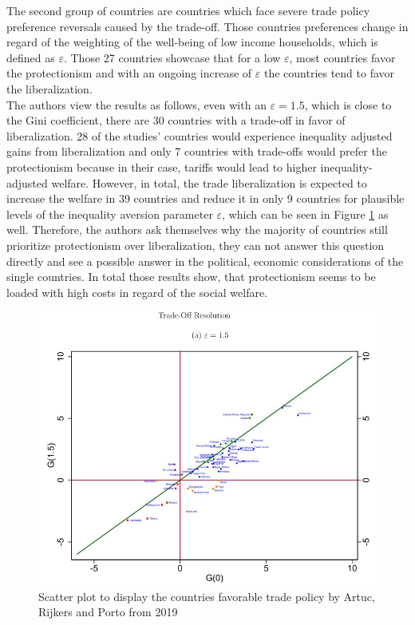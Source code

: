 The second group of countries are countries which face severe trade policy preference reversals caused by the trade-off. Those
countries preferences change in regard of the weighting of the well-being of low income households, which is defined as \(\varepsilon\).
Those 27 countries showcase that for a low \(\varepsilon\), most countries favor the protectionism and with an ongoing increase
of \(\varepsilon\) the countries tend to favor the liberalization. \\
The authors view the results as follows, even with an \(\varepsilon = 1.5\), which is close to the Gini coefficient,
there are 30 countries with a trade-off in favor of liberalization. 28 of the studies' countries would experience inequality
adjusted gains from liberalization and only 7 countries with trade-offs would prefer the protectionism because in their case, 
tariffs would lead to higher inequality-adjusted welfare. However, in total, the trade liberalization is expected to increase 
the welfare in 39 countries and reduce it in only 9 countries for plausible levels of the inequality aversion parameter 
\(\varepsilon\), which can be seen in Figure \ref{fig:tradereso} as well. Therefore, the authors ask themselves why the majority of countries still prioritize protectionism over 
liberalization, they can not answer this question directly and see a possible answer in the political, economic considerations
of the single countries. In total those results show, that protectionism seems to be loaded with high costs in regard of the 
social welfare. \\
\begin{figure}[h!]
    \centering
    \includegraphics*[width=\textwidth]{graphics/trade-off-reso.jpg}
    \caption{Scatter plot to display the countries favorable trade policy by Artuc, Rijkers and Porto from 2019}
    \label{fig:tradereso}
\end{figure}\\

